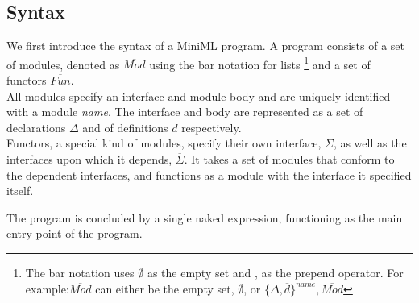 \documentclass[10pt,a4paper,draft]{article}
\begin{document}
\begin{flushleft}
\section{Syntax}


\newcommand{\longspace}{\;\;\;\;\;\;}
\newcommand{\inlinecode}{\texttt}
We first introduce the syntax of a MiniML program. A program consists of a set of modules, denoted as $\overline{\mathit{Mod}}$ using the bar notation for lists \footnote{The bar notation uses $\emptyset$ as the empty set and , as the prepend operator. For example:$\overline{\mathit{Mod}}$ can either be the empty set, $\emptyset$, or $\lbrace \Delta, \overline{\mathit{d}}\rbrace^{name}, \overline{Mod}$} and a set of functors $\overline{\mathit{Fun}}$.
\\[2ex]
All modules specify an interface and module body and are uniquely identified with a module \textit{name}. The interface and body are represented as a set of declarations $\Delta$ and of definitions $d$ respectively.
\\[2ex]
Functors, a special kind of modules, specify  their own interface, $\Sigma$, as well as the interfaces upon which it depends, $\overline{\Sigma}$. It takes a set of modules that conform to the dependent interfaces, and functions as a module with the interface it specified itself.

The program is concluded by a single naked expression, functioning as the main entry point of the program.


\end{flushleft}
\end{document}
